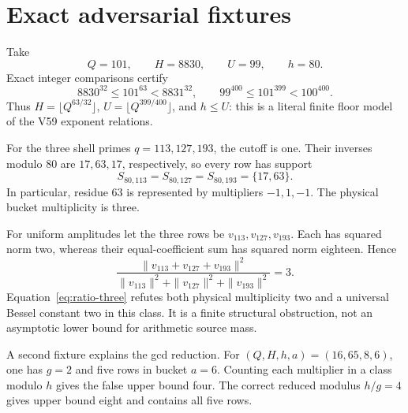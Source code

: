 \section{Exact adversarial fixtures}\label{sec:fixtures}

Take
\[
 Q=101,\qquad H=8830,\qquad U=99,\qquad h=80.
\]
Exact integer comparisons certify
\[
 8830^{32}\le101^{63}<8831^{32},\qquad
 99^{400}\le101^{399}<100^{400}.
\]
Thus $H=\lfloor Q^{63/32}\rfloor$, $U=\lfloor Q^{399/400}\rfloor$, and $h\le U$:
this is a literal finite floor model of the V59 exponent relations.

For the three shell primes $q=113,127,193$, the cutoff is one.  Their inverses modulo
$80$ are $17,63,17$, respectively, so every row has support
\[
 S_{80,113}=S_{80,127}=S_{80,193}=\{17,63\}.
\]
In particular, residue $63$ is represented by multipliers $-1,1,-1$.  The physical
bucket multiplicity is three.

For uniform amplitudes let the three rows be $v_{113},v_{127},v_{193}$.  Each has
squared norm two, whereas their equal-coefficient sum has squared norm eighteen.
Hence
\begin{equation}
 \frac{\|v_{113}+v_{127}+v_{193}\|^2}
      {\|v_{113}\|^2+\|v_{127}\|^2+\|v_{193}\|^2}=3. \label{eq:ratio-three}
\end{equation}
Equation~\eqref{eq:ratio-three} refutes both physical multiplicity two and a universal
Bessel constant two in this class.  It is a finite structural obstruction, not an
asymptotic lower bound for arithmetic source mass.

A second fixture explains the gcd reduction.  For
$(Q,H,h,a)=(16,65,8,6)$, one has $g=2$ and five rows in bucket $a=6$.  Counting each
multiplier in a class modulo $h$ gives the false upper bound four.  The correct reduced
modulus $h/g=4$ gives upper bound eight and contains all five rows.
